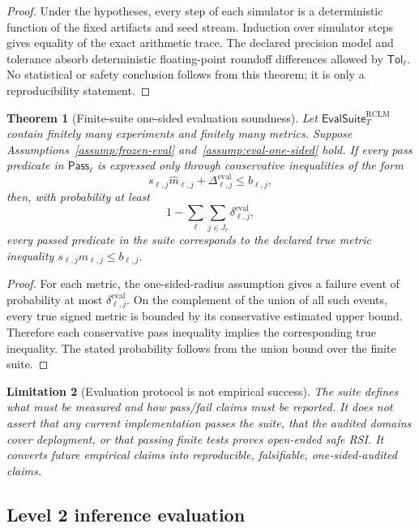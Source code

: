 \documentclass[11pt,a4paper]{article}
\newtheorem{theorem}{Theorem}[section]
\newtheorem{limitation}[theorem]{Limitation}
\newcommand{\RCLM}{\mathrm{RCLM}}
\newcommand{\eval}{\mathrm{eval}}
\begin{document}
\begin{proof}
Under the hypotheses, every step of each simulator is a deterministic function of the fixed artifacts and seed stream.  Induction over simulator steps gives equality of the exact arithmetic trace.  The declared precision model and tolerance absorb deterministic floating-point roundoff differences allowed by \(\mathsf{Tol}_\ell\).  No statistical or safety conclusion follows from this theorem; it is only a reproducibility statement.
\end{proof}

\begin{theorem}[Finite-suite one-sided evaluation soundness]
\label{thm:finite-suite-eval-soundness}
Let \(\mathsf{EvalSuite}^{\RCLM}_T\) contain finitely many experiments and finitely many metrics.  Suppose Assumptions~\ref{assump:frozen-eval} and~\ref{assump:eval-one-sided} hold.  If every pass predicate in \(\mathsf{Pass}_\ell\) is expressed only through conservative inequalities of the form
\[
s_{\ell,j}\widehat m_{\ell,j}+\Delta_{\ell,j}^{\eval}\le b_{\ell,j},
\]
then, with probability at least
\[
1-\sum_{\ell}\sum_{j\in J_\ell}\delta_{\ell,j}^{\eval},
\]
every passed predicate in the suite corresponds to the declared true metric inequality \(s_{\ell,j}m_{\ell,j}\le b_{\ell,j}\).
\end{theorem}

\begin{proof}
For each metric, the one-sided-radius assumption gives a failure event of probability at most \(\delta_{\ell,j}^{\eval}\).  On the complement of the union of all such events, every true signed metric is bounded by its conservative estimated upper bound.  Therefore each conservative pass inequality implies the corresponding true inequality.  The stated probability follows from the union bound over the finite suite.
\end{proof}

\begin{limitation}[Evaluation protocol is not empirical success]
The suite defines what must be measured and how pass/fail claims must be reported.  It does not assert that any current implementation passes the suite, that the audited domains cover deployment, or that passing finite tests proves open-ended safe RSI.  It converts future empirical claims into reproducible, falsifiable, one-sided-audited claims.
\end{limitation}

\subsection{Level 2 inference evaluation}
\end{document}

